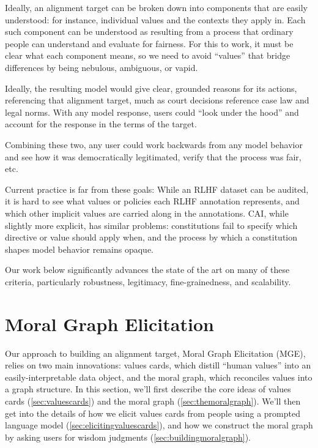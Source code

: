 \documentclass{article}
\theoremstyle{definition}
\begin{document}
Ideally, an alignment target can be broken down into components that are easily understood: for instance, individual values and the contexts they apply in. Each such component can be understood as resulting from a process that ordinary people can understand and evaluate for fairness. For this to work, it must be clear what each component means, so we need to avoid “values” that bridge differences by being nebulous, ambiguous, or vapid.

Ideally, the resulting model would give clear, grounded reasons for its actions, referencing that alignment target, much as court decisions reference case law and legal norms. With any model response, users could “look under the hood” and account for the response in the terms of the target. 

Combining these two, any user could work backwards from any model behavior and see how it was democratically legitimated, verify that the process was fair, etc.

Current practice is far from these goals: While an RLHF dataset can be audited, it is hard to see what values or policies each RLHF annotation represents, and which other implicit values are carried along in the annotations. CAI, while slightly more explicit, has similar problems: constitutions fail to specify which directive or value should apply when, and the process by which a constitution shapes model behavior remains opaque.

Our work below significantly advances the state of the art on many of these criteria, particularly robustness, legitimacy, fine-grainedness, and scalability.


\section{Moral Graph Elicitation}\label{sec:mge}

Our approach to building an alignment target, Moral Graph Elicitation (MGE), relies on two main innovations: values cards, which distill “human values” into an easily-interpretable data object, and the moral graph, which reconciles values into a graph structure. In this section, we’ll first describe the core ideas of values cards (\ref{sec:valuescards}) and the moral graph (\ref{sec:themoralgraph}). We’ll then get into the details of how we elicit values cards from people using a prompted language model (\ref{sec:elicitingvaluescards}), and how we construct the moral graph by asking users for wisdom judgments (\ref{sec:buildingmoralgraph}). 
\end{document}
